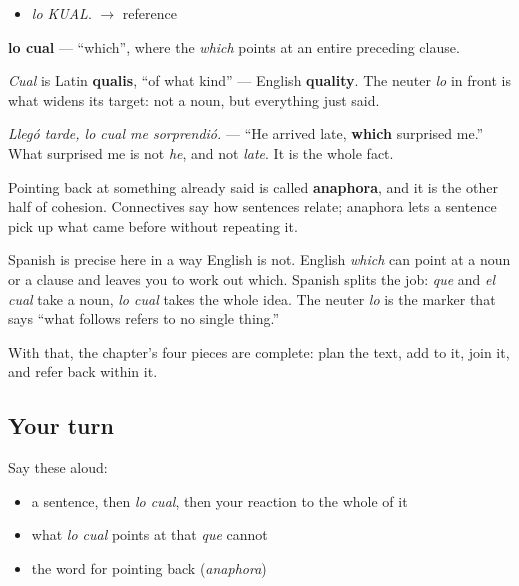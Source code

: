 \begin{sounds}
\begin{itemize}
\raggedright
  \item \emph{lo KUAL}. $\to$ reference
\end{itemize}
\end{sounds}

\begin{cousinweb}
\textbf{lo cual} — \textquotedblleft{}which\textquotedblright{}, where the \emph{which} points at an entire preceding clause.

\emph{Cual} is Latin \textbf{qualis}, \textquotedblleft{}of what kind\textquotedblright{} — English \textbf{quality}. The neuter \emph{lo} in front is what widens its target: not a noun, but everything just said.

\emph{Llegó tarde, lo cual me sorprendió.} — \textquotedblleft{}He arrived late, \textbf{which} surprised me.\textquotedblright{} What surprised me is not \emph{he}, and not \emph{late}. It is the whole fact.
\end{cousinweb}

\begin{grammarlens}[title={What you've built}]
Pointing back at something already said is called \textbf{anaphora}, and it is the other half of cohesion. Connectives say how sentences relate; anaphora lets a sentence pick up what came before without repeating it.

Spanish is precise here in a way English is not. English \emph{which} can point at a noun or a clause and leaves you to work out which. Spanish splits the job: \emph{que} and \emph{el cual} take a noun, \emph{lo cual} takes the whole idea. The neuter \emph{lo} is the marker that says \textquotedblleft{}what follows refers to no single thing.\textquotedblright{}

With that, the chapter's four pieces are complete: plan the text, add to it, join it, and refer back within it.
\end{grammarlens}

\subsection*{Your turn}
Say these aloud:

\begin{itemize}
\raggedright
  \item a sentence, then \emph{lo cual}, then your reaction to the whole of it
  \item what \emph{lo cual} points at that \emph{que} cannot
  \item the word for pointing back (\emph{anaphora})
\end{itemize}

